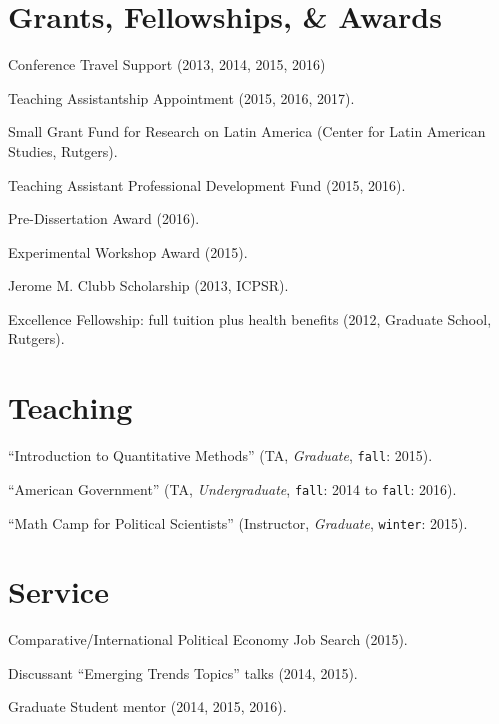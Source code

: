 \documentclass[letterpaper]{article}
\renewenvironment{itemize}{
  \begin{list}{}{
    \setlength{\leftmargin}{1.5em}
  }
}{
  \end{list}
}
\begin{document}
\section*{Grants, Fellowships, \& Awards}

\begin{itemize}
\item Conference Travel Support (2013, 2014, 2015, 2016)
\item Teaching Assistantship Appointment (2015, 2016, 2017).
\item Small Grant Fund for Research on Latin America (Center for Latin American Studies, Rutgers).
\item Teaching Assistant Professional Development Fund (2015, 2016).
\item Pre-Dissertation Award (2016).
\item Experimental Workshop Award (2015).
\item Jerome M. Clubb Scholarship (2013, ICPSR).
\item Excellence Fellowship: full tuition plus health benefits (2012, Graduate School, Rutgers).
\end{itemize}


\section*{Teaching}

\begin{itemize}
\item ``Introduction to Quantitative Methods'' (TA, \emph{Graduate}, \texttt{fall}: 2015).
\item ``American Government'' (TA, \emph{Undergraduate}, \texttt{fall}: 2014 to \texttt{fall}: 2016).
\item ``Math Camp for Political Scientists'' (Instructor, \emph{Graduate}, \texttt{winter}: 2015).
\end{itemize}


\section*{Service}

\begin{itemize}
\item Comparative/International Political Economy Job Search (2015).
\item Discussant ``Emerging Trends Topics'' talks (2014, 2015).
\item Graduate Student mentor (2014, 2015, 2016).
\end{itemize}
\end{document}
